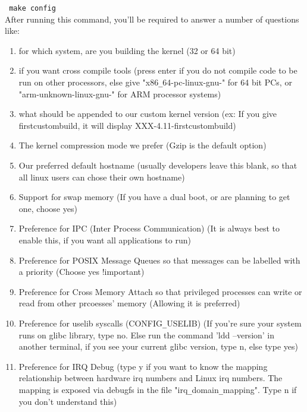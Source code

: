 \documentclass[12pt,a4paper]{article}
\begin{document}
\texttt{\ make config}\\
\newline
After running this command, you'll be required to answer a number of questions like:\\
\newline
\begin{enumerate}\item for which system, are you building the kernel (32 or 64 bit)
\newline\item if you want cross compile tools (press enter if you do not compile code to be run on other processors, else give "x86\texttt{\_}64-pc-linux-gnu-" for 64 bit PCs, or "arm-unknown-linux-gnu-" for ARM processor systems)
\newline\item what should be appended to our custom kernel version (ex: If you give firstcustombuild, it will display XXX-4.11-firstcustombuild)
\newline\item The kernel compression mode we prefer (Gzip is the default option)
\newline\item Our preferred default hostname (usually developers leave this blank, so that all linux users can chose their own hostname)
\newline\item Support for swap memory (If you have a dual boot, or are planning to get one, choose yes)
\newline\item Preference for IPC (Inter Process Communication) (It is always best to enable this, if you want all applications to run)
\newline\item Preference for POSIX Message Queues so that messages can be labelled with a priority (Choose yes !important)
\newline\item Preference for Cross Memory Attach so that privileged processes can write or read from other prcoesses' memory (Allowing it is preferred)
\newline
\item Preference for uselib syscalls (CONFIG\texttt{\_}USELIB) (If you're sure your system runs on glibc library, type no. Else run the command 'ldd --version' in another terminal, if you see your current glibc version, type n, else type yes)
\newline
\item Preference for IRQ Debug (type y if you want to know the mapping relationship between hardware irq numbers and Linux irq numbers. The mapping is exposed via debugfs in the file "irq\texttt{\_}domain\texttt{\_}mapping". Type n if you don't understand this)

\end{enumerate}
\end{document}
